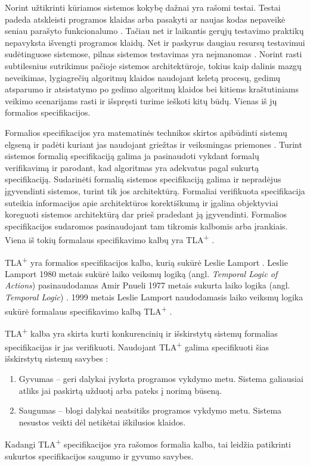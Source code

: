 \documentclass{VUMIFPSmagistrinis}
\begin{document}
		Norint užtikrinti kūriamos sistemos kokybę dažnai yra rašomi testai. 
		Testai padeda atskleisti programos klaidas arba pasakyti ar naujas kodas nepaveikė seniau parašyto funkcionalumo \cite{819971}.
		Tačiau net ir laikantis gerųjų testavimo praktikų nepavyksta išvengti programos klaidų.
		Net ir paskyrus daugiau resursų testavimui sudėtinguose sistemose, pilnas sistemos testavimas yra neįmanomas \cite{sullivan2004software}.
		Norint rasti subtilesnius sutrikimus pačioje sistemos architektūroje, tokius kaip dalinis mazgų neveikimas, lygiagrečių algoritmų klaidos naudojant keletą procesų, gedimų atsparumo ir atsistatymo po gedimo algoritmų klaidos bei kitiems kraštutiniams veikimo scenarijams \cite{newcombe2014use} rasti ir išspręsti turime ieškoti kitų būdų. 
		Vienas iš jų formalios specifikacijos.

Formalios specifikacijos yra matematinės technikos skirtos apibūdinti sistemų elgseną ir padėti kuriant jas naudojant griežtas ir veiksmingas priemones \cite{holzmann1995improvement}.
		Turint sistemos formalią specifikaciją galima ja pasinaudoti vykdant formalų verifikavimą ir parodant, kad algoritmas yra adekvatus pagal sukurtą specifikaciją.
		Sudarinėti formalią sistemos specifikaciją galima ir nepradėjus įgyvendinti sistemos, turint tik jos architektūrą. 
		Formaliai verifikuota specifikacija suteikia informacijos apie architektūros korektiškumą ir įgalina objektyviai koreguoti sistemos architektūrą dar prieš pradedant ją įgyvendinti.
		Formalios specifikacijos sudaromos pasinaudojant tam tikromis kalbomis arba įrankiais.
		Viena iš tokių formalaus specifikavimo kalbų yra TLA\textsuperscript{+} \cite{lamport2002specifying}.
		

		TLA\textsuperscript{+} yra formalios specifikacijos kalba, kurią sukūrė Leslie Lamport \cite{lamport2002specifying}.
		Leslie Lamport 1980 metais sukūrė laiko veiksmų logiką (angl. {\it Temporal Logic of Actions}) \cite{10.1145/177492.177726} pasinaudodamas Amir Pnueli 1977 metais sukurta laiko logika (angl. {\it Temporal Logic}) \cite{4567924}.
		1999 metais Leslie Lamport naudodamasis laiko veiksmų logika sukūrė formalaus specifikavimo kalbą TLA\textsuperscript{+} \cite{lamport2002specifying}.
		

TLA\textsuperscript{+} kalba yra skirta kurti konkurencinių ir išskirstytų sistemų formalias specifikacijas ir jas verifikuoti.
		Naudojant TLA\textsuperscript{+} galima specifikuoti šias išskirstytų sistemų savybes \cite{lamport2019safety}:
		\begin{enumerate}
			\item{Gyvumas -- geri dalykai įvyksta programos vykdymo metu. Sistema galiausiai atliks jai paskirtą užduotį arba pateks į norimą būseną.}
			\item{Saugumas -- blogi dalykai neatsitiks programos vykdymo metu. Sistema nesustos veikti dėl netikėtai iškilusios klaidos.}
		\end{enumerate}
		Kadangi TLA\textsuperscript{+} specifikacijos yra rašomos formalia kalba, tai leidžia patikrinti sukurtos specifikacijos saugumo ir gyvumo savybes.
		
\end{document}
